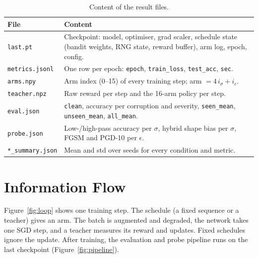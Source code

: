 \documentclass[a4paper,12pt]{report}
\begin{document}
\begin{table}[htbp]
\caption{Content of the result files.}
\label{tab:files}
\begin{center}
\footnotesize
\begin{tabular}{|l|P{10.5cm}|} \hline
\textbf{File} & \textbf{Content} \\ \hline
\texttt{last.pt} & Checkpoint: model, optimiser, grad scaler, schedule state (bandit weights, RNG state, reward buffer), arm log, epoch, config. \\
\texttt{metrics.jsonl} & One row per epoch: \texttt{epoch}, \texttt{train\_loss}, \texttt{test\_acc}, \texttt{sec}. \\
\texttt{arms.npy} & Arm index (0--15) of every training step; arm $= 4\,i_\sigma + i_c$. \\
\texttt{teacher.npz} & Raw reward per step and the 16-arm policy per step. \\
\texttt{eval.json} & \texttt{clean}, accuracy per corruption and severity, \texttt{seen\_mean}, \texttt{unseen\_mean}, \texttt{all\_mean}. \\
\texttt{probe.json} & Low-/high-pass accuracy per $\sigma$, hybrid shape bias per $\sigma$, FGSM and PGD-10 per $\epsilon$. \\
\texttt{*\_summary.json} & Mean and std over seeds for every condition and metric. \\ \hline
\end{tabular}
\end{center}
\end{table}

\section{Information Flow}

Figure~\ref{fig:loop} shows one training step. The schedule (a fixed sequence or a teacher) gives an arm. The batch is augmented and degraded, the network takes one SGD step, and a teacher measures its reward and updates. Fixed schedules ignore the update. After training, the evaluation and probe pipeline runs on the last checkpoint (Figure~\ref{fig:pipeline}).
\end{document}
